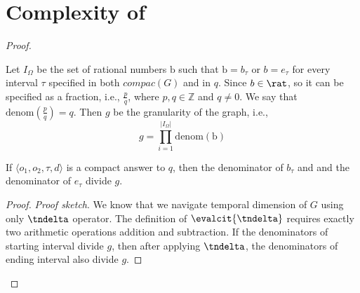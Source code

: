 \section{Complexity of \pbm}
\label{sec:proofs_complexity}






\begin{proof}
    $ $\newline

    \noindent Let $I_{\Omega}$ be the set of rational numbers $\mathrm{b}$ such that $\mathrm{b} = b_{\tau}$ or $b =
    e_{\tau}$ for every interval
    $\tau$ specified in both $compac(G)$ and in $q$. Since $b \in \rat$, so it can be
    specified as a fraction, i.e., $\frac{p}{q}$, where $p,q \in
    \mathbb{Z}$ and $q \neq 0$. We say that
    $\mathrm{denom}(\frac{p}{q})=q$. Then $g$ be the
    granularity of the graph,
    i.e.,
    \[
        g=\prod_{i=1}^{\lvert I_{\Omega} \rvert} \mathrm{denom}(\mathrm{b})
    \]

    \begin{lemma}\label{lemma:interval_boundaries}
    If $\langle o_1,o_2,\tau,d \rangle$ is a compact answer to $q$, then the denominator of $b_{\tau}$ and
    and the denominator of $e_{\tau}$ divide $g$.

  \end{lemma}
  \begin{proof}

      \emph{Proof sketch}. We know that we navigate temporal dimension of $G$ using only $\tndelta$
      operator. The definition of $\evalcit{\tndelta}$ requires exactly two
      arithmetic operations addition and subtraction. If the denominators of starting interval
      divide $g$, then after applying $\tndelta$, the denominators of ending
      interval also divide $g$.    

  \end{proof}




\end{proof}
